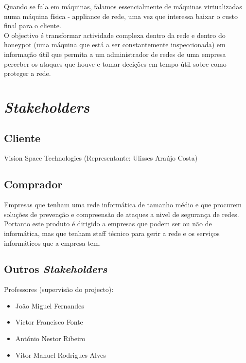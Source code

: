 Quando se fala em máquinas, falamos essencialmente de máquinas virtualizadas numa máquina física - appliance de rede,
uma vez que interessa baixar o custo final para o cliente.\\

O objectivo é transformar actividade complexa dentro da rede e dentro do honeypot (uma máquina que está a ser constantemente inspeccionada) em
informação útil que permita a um administrador de redes de uma empresa perceber os ataques que houve e tomar decições em tempo útil sobre como proteger a rede.


\section{\emph{Stakeholders}}

\subsection{Cliente}
Vision Space Technologies (Representante: Ulisses Araújo Costa)

\subsection{Comprador}
Empresas que tenham uma rede informática de tamanho médio e que procurem soluções de prevenção e compreensão de ataques a nivel de segurança de redes.
Portanto este produto é dirigido a empresas que podem ser ou não de informática, mas que tenham staff técnico para gerir a rede e os serviços
informáticos que a empresa tem.

\subsection{Outros \emph{Stakeholders}}
Professores (supervisão do projecto):
\begin{itemize}
\item João Miguel Fernandes
\item Victor Francisco Fonte
\item António Nestor Ribeiro
\item Vitor Manuel Rodrigues Alves
\end{itemize}
